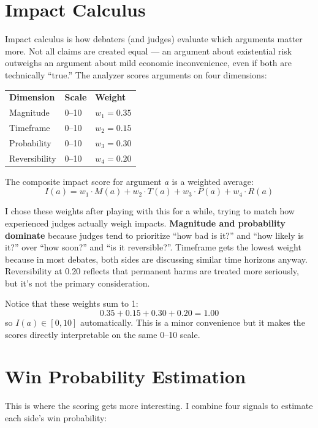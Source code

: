 \documentclass[11pt]{article}
\begin{document}
\section{Impact Calculus}

Impact calculus is how debaters (and judges) evaluate which arguments matter more. Not all claims are created equal --- an argument about existential risk outweighs an argument about mild economic inconvenience, even if both are technically ``true.'' The analyzer scores arguments on four dimensions:

\begin{center}
\begin{tabular}{lll}
    \textbf{Dimension} & \textbf{Scale} & \textbf{Weight} \\
    Magnitude & 0--10 & $w_1 = 0.35$ \\
    Timeframe & 0--10 & $w_2 = 0.15$ \\
    Probability & 0--10 & $w_3 = 0.30$ \\
    Reversibility & 0--10 & $w_4 = 0.20$
\end{tabular}
\end{center}

The composite impact score for argument $a$ is a weighted average:
\[
    I(a) = w_1 \cdot M(a) + w_2 \cdot T(a) + w_3 \cdot P(a) + w_4 \cdot R(a)
\]

I chose these weights after playing with this for a while, trying to match how experienced judges actually weigh impacts. \textbf{Magnitude and probability dominate} because judges tend to prioritize ``how bad is it?'' and ``how likely is it?'' over ``how soon?'' and ``is it reversible?''. Timeframe gets the lowest weight because in most debates, both sides are discussing similar time horizons anyway. Reversibility at 0.20 reflects that permanent harms are treated more seriously, but it's not the primary consideration.

Notice that these weights sum to 1:
\[
    0.35 + 0.15 + 0.30 + 0.20 = 1.00
\]
so $I(a) \in [0, 10]$ automatically. This is a minor convenience but it makes the scores directly interpretable on the same 0--10 scale.

\section{Win Probability Estimation}

This is where the scoring gets more interesting. I combine four signals to estimate each side's win probability:
\end{document}
